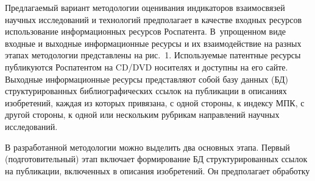 \begin{multicols}{2}
  Предлагаемый вариант методологии оценивания индикаторов взаимосвязей научных 
исследований и технологий предполагает в качестве входных ресурсов использование 
информационных ресурсов Роспатента. В~упрощенном виде входные и выходные 
информационные ресурсы и их взаимодействие на разных этапах методологии пред\-став\-ле\-ны на 
рис.~1. Используемые патентные ресурсы публикуются Роспатентом на CD/DVD носителях и 
доступны на его сайте. Выходные информационные ресурсы представляют собой базу данных (БД)
структурированных библиографических ссылок на публикации в описаниях изобретений, 
каждая из которых привязана, с одной стороны, к индексу МПК, с другой стороны, к одной или 
нескольким рубрикам направлений научных исследований.
  
  В разработанной методологии можно выделить два основных этапа. Первый 
(подготовительный) этап включает формирование БД структурированных ссылок на 
публикации, включенных в описания изобретений. Он предполагает обработку\linebreak\vspace*{-12pt}

\pagebreak

\end{multicols}

      \begin{figure} %
         \vspace*{1pt}
 \begin{center}
 \mbox{%
 \epsfxsize=127.565mm
 }
 \end{center}
 \vspace*{-6pt}
\vspace*{3pt}
      \end{figure}


